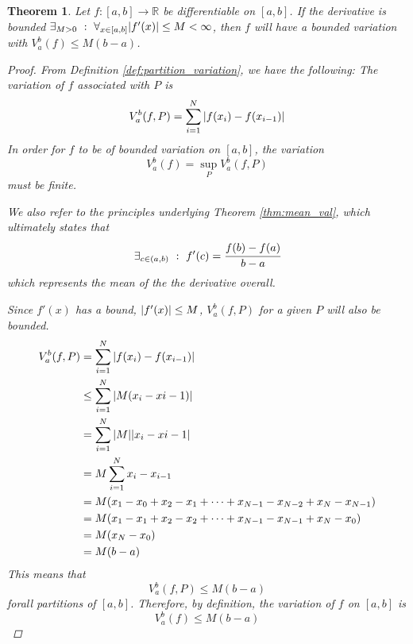 \documentclass[]{article}
\newcommand{\R}{\mathbb{R}}
\newcommand{\st}{\ : \ }
\newtheorem{theorem}{Theorem}
\begin{document}
\begin{theorem}
    Let $f : [a,b] \to \R$ be differentiable on $[a,b]$. 
    If the derivative is bounded $\exists_{M > 0} \st \forall_{x \in [a,b]} \abs{f'(x)} \leq M < \infty$, 
    then $f$ will have a bounded variation with $V_{a}^{b}(f) \leq M(b-a)$.
    \begin{proof}
        From Definition \ref{def:partition_variation}, we have the following:
        The variation of $f$ associated with $P$ is \[
            V_{a}^{b}(f,P) = \sum_{i=1}^{N} \abs{f(x_i) - f(x_{i-1})}
        \]
        In order for $f$ to be of bounded variation on $[a,b]$, the variation \[
            V_{a}^{b}(f) = \sup_{P} V_{a}^{b} (f,P)
        \] must be finite.
        
        We also refer to the principles underlying Theorem \ref{thm:mean_val}, which ultimately states that \[
            \exists_{c \in (a,b)} \st f'(c) = \cfrac{f(b) - f(a)}{b-a}
        \] which represents the mean of the the derivative overall.

        Since $f'(x)$ has a bound, $\abs{f'(x)} \leq M$, $V_{a}^{b}(f,P)$ for a given $P$ will also be bounded.
        \begin{align*}
            V_{a}^{b}(f,P) 
                &= \sum_{i=1}^{N} \abs{f(x_i) - f(x_{i-1})}\\
                &\leq \sum_{i=1}^{N} \abs{M (x_{i} - x{i-1})}\\
                &= \sum_{i=1}^{N} \abs{M} \abs{x_{i} - x{i-1}}\\
                &= M \sum_{i=1}^{N} x_{i} - x_{i-1}\\
                &= M \qty(x_1 - x_0 + x_2 - x_1 + \dots + x_{N-1} - x_{N-2} + x_{N} - x_{N-1})\\
                &= M \qty(x_1 - x_1 + x_2 - x_2 + \dots + x_{N-1} - x_{N-1} + x_{N} - x_0)\\
                &= M \qty(x_{N} - x_0)\\
                &= M \qty(b - a)
        \end{align*}
        This means that\[
            V_{a}^{b}(f,P) \leq M (b-a)
        \] forall partitions of $[a,b]$.
        Therefore, by definition, the variation of $f$ on $[a,b]$ is
        \[\boxed{
            V_{a}^{b}(f) \leq M (b-a)
        }\]
    \end{proof}
\end{theorem}
\end{document}
